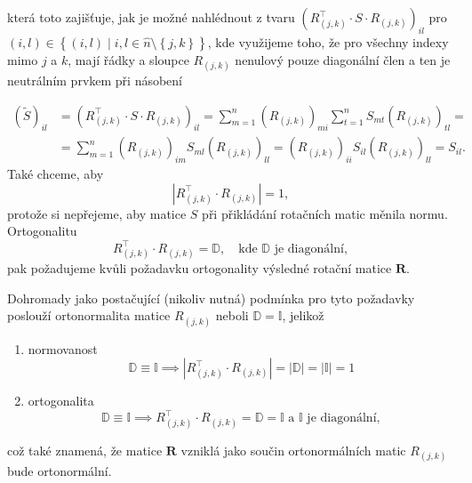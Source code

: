 která toto zajišťuje, jak je možné nahlédnout z tvaru $\left(R_{(j,k)}^{\top}\cdot S \cdot R_{(j,k)}\right)_{il}$ pro $(i,l) \in \left\{ (i,l) \mid i,l \in \hat{n}\setminus \left\{ j,k \right\} \right\} $, kde využijeme toho, že pro všechny indexy mimo $j$ a $k$, mají řádky a sloupce $R_{(j,k)}$ nenulový pouze diagonální člen a ten je neutrálním prvkem při násobení

\[
	\begin{split}
		\left(\tilde{S}\right)_{il} &= \left( R_{(j,k)}^{\top} \cdot S \cdot R_{(j,k)} \right)_{il} = \sum_{m = 1}^{n} \left( R_{(j,k)} \right)_{mi} \sum_{t = 1}^{n} S_{mt} \left( R_{(j,k)} \right)_{tl} = \\
		&= \sum_{m=1}^{n} \left( R_{(j,k)} \right)_{im} S_{ml} \left( R_{(j,k)} \right)_{ll} = \left( R_{(j,k)} \right)_{ii}S_{il}\left( R_{(j,k)} \right)_{ll} = S_{il}
		.\end{split}
\]
Také chceme, aby
\begin{equation}
	\label{eq:pozadavek_specialni_linearity}
	\left|R_{(j,k)}^{\top}\cdot R_{(j,k)}\right| = 1,
\end{equation}
protože si nepřejeme, aby matice $S$ při přikládání rotačních matic měnila normu. Ortogonalitu
\[
	R_{(j,k)}^{\top}\cdot R_{(j,k)} = \mathbb{D},\quad \text{kde } \mathbb{D} \text{ je diagonální},
\]
pak požadujeme kvůli požadavku ortogonality výsledné rotační matice $\boldsymbol{R}$.

Dohromady jako postačující (nikoliv nutná) podmínka pro tyto požadavky poslouží ortonormalita matice $R_{(j,k)}$ neboli $\mathbb{D} = \mathbb{I}$, jelikož
\begin{enumerate}[label=(\alph*)]
	\item normovanost
	      \[
		      \mathbb{D} \equiv \mathbb{I} \implies \left| R_{(j,k)}^{\top}\cdot R_{(j,k)} \right| = \left| \mathbb{D} \right| = \left| \mathbb{I} \right|  = 1
	      \]
	\item ortogonalita
	      \[
		      \mathbb{D} \equiv \mathbb{I} \implies R_{(j,k)}^{\top}\cdot R_{(j,k)} = \mathbb{D} = \mathbb{I} \text{ a } \mathbb{I} \text{ je diagonální},
	      \]
\end{enumerate}
což také znamená, že matice $\boldsymbol{R}$ vzniklá jako součin ortonormálních matic $R_{(j,k)}$ bude ortonormální.


